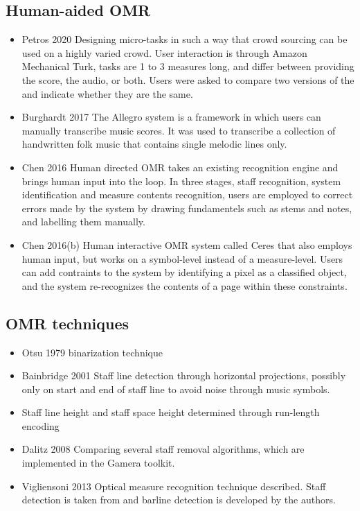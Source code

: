 \subsection{Human-aided OMR}
\begin{itemize}
    \item Petros 2020 \citep{Samiotis2020} Designing micro-tasks in such a way that crowd sourcing can be used on a highly varied crowd. User interaction is through Amazon Mechanical Turk, tasks are 1 to 3 measures long, and differ between providing the score, the audio, or both. Users were asked to compare two versions of the and indicate whether they are the same. \citep{Burghardt2017, Bellini2007, Chen2016, CalvoZaragoza2019}
    \item Burghardt 2017 \citep{Burghardt2017} The Allegro system is a framework in which users can manually transcribe music scores. It was used to transcribe a collection of handwritten folk music that contains single melodic lines only. \citep{Bainbridge2001, Bellini2007, Raphael2011, Rebelo2012}
    \item Chen 2016 \citep{Chen2016} Human directed OMR takes an existing recognition engine and brings human input into the loop. In three stages, staff recognition, system identification and measure contents recognition, users are employed to correct errors made by the system by drawing fundamentels such as stems and notes, and labelling them manually.
    \item Chen 2016(b) \citep{Chen2016b} Human interactive OMR system called Ceres that also employs human input, but works on a symbol-level instead of a measure-level. Users can add contraints to the system by identifying a pixel as a classified object, and the system re-recognizes the contents of a page within these constraints.
\end{itemize}

\subsection{OMR techniques}
\begin{itemize}
    \item Otsu 1979 \citep{Otsu1979} binarization technique

    \item Bainbridge 2001 \citep{Bainbridge2001} Staff line detection through horizontal projections, possibly only on start and end of staff line to avoid noise through music symbols.

    \item Staff line height and staff space height determined through run-length encoding \citep{Rebelo2012}

    \item Dalitz 2008 \citep{Dalitz2008} Comparing several staff removal algorithms, which are implemented in the Gamera toolkit.

    \item Vigliensoni 2013 \citep{Vigliensoni2013} Optical measure recognition technique described. Staff detection is taken from \citep{} and barline detection is developed by the authors.
\end{itemize}

